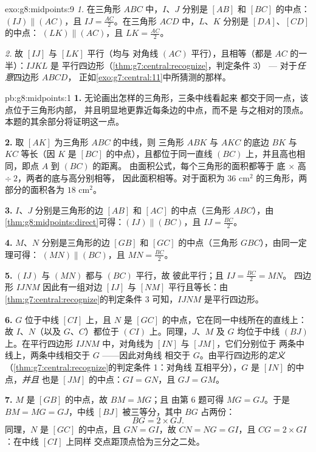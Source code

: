 \begin{solution}{exo:g8:midpoints:9}
\emph{1.} 在三角形 $ABC$ 中，$I$、$J$ 分别是 $[AB]$ 和
$[BC]$ 的中点：$(IJ) \parallel (AC)$，且 $IJ = \frac{AC}{2}$。在三角形
$ACD$ 中，$L$、$K$ 分别是 $[DA]$、$[CD]$ 的中点：
$(LK) \parallel (AC)$，且 $LK = \frac{AC}{2}$。

\emph{2.} 故 $[IJ]$ 与 $[LK]$ 平行（均与
对角线 $(AC)$ 平行），且相等（都是 $AC$ 的一半）：$IJKL$ 是
平行四边形（\cref{thm:g7:central:recognize}，判定条件 3） --- 
对于\emph{任意}四边形 $ABCD$，
正如\cref{exo:g7:central:11}中所猜测的那样。
\end{solution}

\begin{solution}{pb:g8:midpoints:1}
\textbf{1.} 无论画出怎样的三角形，三条中线看起来
都交于同一点，该点位于三角形内部，
并且明显地更靠近每条边的中点，而不是
与之相对的顶点。本题的其余部分将证明这一点。

\textbf{2.} 取 $[AK]$ 为三角形 $ABC$ 的中线，则
三角形 $ABK$ 与 $AKC$ 的底边 $BK$ 与 $KC$
等长（因 $K$ 是 $[BC]$ 的中点），且都位于同一直线
$(BC)$ 上，并且高也相同，即点 $A$ 到 $(BC)$ 的距离。
由面积公式，每个三角形的面积都等于
底 $\times$ 高 $\div\ 2$，两者的底与高分别相等，
因此面积相等。对于面积为
$36$ cm$^2$ 的三角形，两部分的面积各为 $18$ cm$^2$。

\textbf{3.} $I$、$J$ 分别是三角形的边 $[AB]$ 和
$[AC]$ 的中点（三角形 $ABC$），由
\cref{thm:g8:midpoints:direct}可得：$(IJ) \parallel (BC)$，且
$IJ = \frac{BC}{2}$。

\textbf{4.} $M$、$N$ 分别是三角形的边 $[GB]$ 和
$[GC]$ 的中点（三角形 $GBC$），由同一定理可得：
$(MN) \parallel (BC)$，且 $MN = \frac{BC}{2}$。

\textbf{5.} $(IJ)$ 与 $(MN)$ 都与 $(BC)$ 平行，故
彼此平行；且 $IJ = \frac{BC}{2} = MN$。
四边形 $IJNM$ 因此有一组对边 $[IJ]$ 与
$[NM]$ 平行且等长：由
\cref{thm:g7:central:recognize}的判定条件 3 可知，$IJNM$ 是平行四边形。

\textbf{6.} $G$ 位于中线 $[CI]$ 上，且 $N$ 是
$[GC]$ 的中点，它在同一中线所在的直线上：
故 $I$、$N$（以及 $G$、$C$）都位于 $(CI)$ 上。同理，$J$、$M$
及 $G$ 均位于中线 $(BJ)$ 上。在平行四边形
$IJNM$ 中，对角线为 $[IN]$ 与 $[JM]$，它们分别位于
两条中线上，两条中线相交于 $G$ ——因此对角线
相交于 $G$。由平行四边形的\emph{定义}
（\cref{thm:g7:central:recognize}的判定条件 1：对角线
互相平分），$G$ 是 $[IN]$ 的中点，\emph{并且}
也是 $[JM]$ 的中点：$GI = GN$，且 $GJ = GM$。

\textbf{7.} $M$ 是 $[GB]$ 的中点，故 $BM = MG$；且
由第 6 题可得 $MG = GJ$。于是 $BM = MG = GJ$，中线
$[BJ]$ 被三等分，其中 $BG$ 占两份：
\[
BG = 2 \times GJ .
\]
同理，$N$ 是 $[GC]$ 的中点，且 $GN = GI$，故
$CN = NG = GI$，且 $CG = 2 \times GI$：在中线 $[CI]$ 上同样
交点距顶点恰为三分之二处。


\end{solution}
